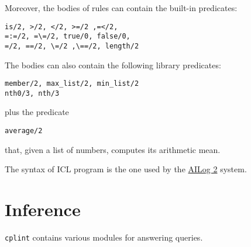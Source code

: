 \documentclass[a4paper,10pt]{scrartcl}
\begin{document}
Moreover, the bodies of rules can contain the built-in predicates:
\begin{verbatim}
is/2, >/2, </2, >=/2 ,=</2,
=:=/2, =\=/2, true/0, false/0,
=/2, ==/2, \=/2 ,\==/2, length/2
\end{verbatim}
The bodies can also contain the following
 library predicates:
\begin{verbatim}
member/2, max_list/2, min_list/2
nth0/3, nth/3
\end{verbatim}
plus the predicate
\begin{verbatim}
average/2
\end{verbatim}
that, given a list of numbers, computes its arithmetic mean.

The syntax of ICL program is the one used by the  \href{http://www.cs.ubc.ca/\string ~poole/aibook/code/ailog/ailog2.html}{AILog 2} system.
\section{Inference}
\texttt{cplint} contains various modules for answering queries.

\end{document}
